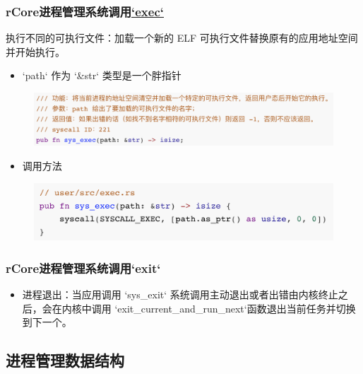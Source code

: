 \begin{frame}[fragile]
    \frametitle{rCore进程管理系统调用\href{https://rcore-os.github.io/rCore-Tutorial-Book-v3/chapter5/1process.html\#exec}{`exec`}}
    执行不同的可执行文件：加载一个新的 ELF 可执行文件替换原有的应用地址空间并开始执行。
    \begin{itemize}
        \item `path` 作为 `\&str` 类型是一个胖指针
    \end{itemize}
% 
	\begin{figure}
		\centering
		\includegraphics[width=0.75\linewidth]{figs/exec.png}
	\end{figure}



% 
    \begin{itemize}
        \item 调用方法
    \end{itemize}
% 
	\begin{figure}
		\centering
		\includegraphics[width=0.65\linewidth]{figs/exec-call.png}
	\end{figure}



% 
\end{frame}
\begin{frame}[fragile]
    \frametitle{rCore进程管理系统调用`exit`}
    \begin{itemize}
        \item 进程退出：当应用调用 `sys\_exit` 系统调用主动退出或者出错由内核终止之后，会在内核中调用 `exit\_current\_and\_run\_next`函数退出当前任务并切换到下一个。
    \end{itemize}
% 
% 
% 
\subsection{进程管理数据结构}
% 
\end{frame}
